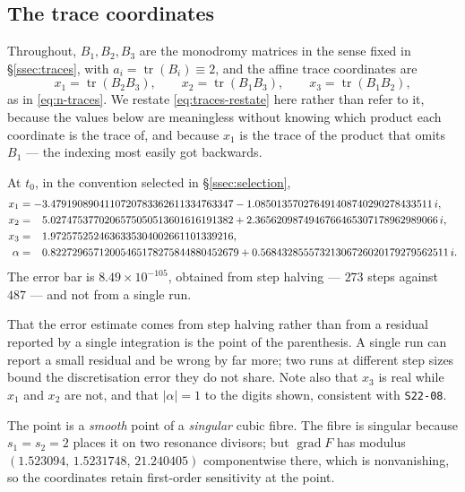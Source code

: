 \subsection{The trace coordinates}\label{ssec:traces-value}

Throughout, $B_1,B_2,B_3$ are the monodromy matrices in the sense fixed in
\S\ref{ssec:traces}, with $a_i=\operatorname{tr}(B_i)\equiv 2$, and the affine
trace coordinates are
\begin{equation}\label{eq:traces-restate}
x_1=\operatorname{tr}(B_2B_3),\qquad
x_2=\operatorname{tr}(B_1B_3),\qquad
x_3=\operatorname{tr}(B_1B_2),
\end{equation}
as in \eqref{eq:n-traces}. We restate \eqref{eq:traces-restate} here rather
than refer to it, because the values below are meaningless without knowing
which product each coordinate is the trace of, and because $x_1$ is the trace
of the product that omits $B_1$ --- the indexing most easily got backwards.

\begin{remark}
At $t_0$, in the convention selected in \S\ref{ssec:selection},
\begin{align*}
x_1&=-3.4791908904110720783362611334763347
 -1.085013570276491408740290278433511\,i,\\
x_2&=\hphantom{-}5.0274753770206575050513601616191382
 +2.3656209874946766465307178962989066\,i,\\
x_3&=\hphantom{-}1.9725752524636335304002661101339216,\\
\alpha&=\hphantom{-}0.82272965712005465178275844880452679
 +0.56843285557321306726020179279562511\,i.
\end{align*}
The error bar is $8.49\times10^{-105}$, obtained from step halving --- $273$
steps against $487$ --- and not from a single
run.
\end{remark}

That the error estimate comes from step halving rather than from a residual
reported by a single integration is the point of the parenthesis. A single run
can report a small residual and be wrong by far more; two runs at different
step sizes bound the discretisation error they do not share. Note also that
$x_3$ is real while $x_1$ and $x_2$ are not, and that
$|\alpha|=1$ to the digits shown, consistent with \texttt{S22-08}.

\begin{remark}
The point is a \emph{smooth} point of a \emph{singular} cubic fibre. The fibre
is singular because $s_1=s_2=2$ places it on two resonance divisors; but
$\operatorname{grad}F$ has modulus $(1.523094,\,1.5231748,\,21.240405)$
componentwise there, which is nonvanishing, so the coordinates retain
first-order sensitivity at the point.
\end{remark}

